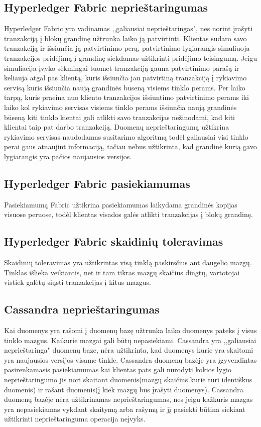 \documentclass{VUMIFPSkursinis}
\begin{document}
	\subsection{Hyperledger Fabric neprieštaringumas}
		Hyperledger Fabric yra vadinamas ,,galiausiai neprieštaringas", nes norint įrašyti tranzakciją į blokų grandinę užtrunka laiko ją patvirtinti. Klientas sudaro savo tranzakciją ir išsiunčia ją patvirtinimo perą, patvirtinimo lygiarangis simuliuoja tranzakcijos pridėjimą į grandinę siekdamas užtikrinti pridėjimo teisingumą. Jeigu simuliacija įvyko sėkmingai tuomet tranzakciją gauna patvirtinimo parašą ir keliauja atgal pas klientą, kuris išsiunčia jau patvirtiną tranzakciją į rykiavimo servisą kuris išsiunčia naują grandinės buseną visiems tinklo perams. Per laiko tarpą, kuris praeina nuo kliento tranzakcijos išsiuntimo patvirtinimo perams iki laiko kol rykiavimo servisas visiems tinklo perams išsiunčia naują grandinės būseną kiti tinklo kientai gali atlikti savo tranzakcijas nežinodami, kad kiti klientai taip pat darbo tranzakciją. Duomenų neprieštaringumą užtikrina rykiavimo servisas naudodamas susitarimo algoritmą todėl galiausiai visi tinklo perai gaus atnaujint informaciją, tačiau nebus užtikrinta, kad grandinė kurią gavo lygiarangis yra pačios naujausios versijos. \cite{HypDoc}
	\subsection{Hyperledger Fabric pasiekiamumas}
		Pasiekiamumą Fabric užtikrina pasiekiamumas laikydama grandinės kopijas visuose peruose, todėl klientas visados galės atlikti tranzakcijas į blokų grandinę. \cite{HypDoc}
	\subsection{Hyperledger Fabric skaidinių toleravimas}
		Skaidinių toleravimas yra užtikrintas visą tinklą paskirsčius ant daugelio mazgų. Tinklas išlieka veikiantis, net ir tam tikras mazgų skaičius dingtų, vartotojai vistiek galėtų siųsti tranzakcijas į kitus mazgus\cite{HypDoc}.
	\subsection{Cassandra neprieštaringumas}
		Kai duomenys yra rašomi į duomenų bazę užtrunka laiko duomenys pateks į visus tinklo mazgus. Kaikurie mazgai gali būtų nepasiekiami. Cassandra yra ,,galiausiai neprieštaringa" duomenų baze, nėra užtikrinta, kad duomenys kurie yra skaitomi yra naujausios versijos visame tinkle. 
Cassandra duomenų bazėje yra įgyvendintas pasirenkamasis pasiekiamumas kai klientas pats gali nurodyti kokios lygio neprieštaringumo jis nori skaitant duomenis(mazgų skaičius kurie turi identiškus duomenis) ir rašant duomenis(į kiek mazgų bus įrašyti duomenys). Cassandra duomenų bazėje nėra užtikrinamas neprieštaringumas, nes jeigu kažkuris mazgas yra nepasiekiamas vykdant skaitymą arba rašymą ir jį pasiekti būtina siekiant užtikrinti neprieštaringuma operacija neįvyks. \cite{CasDesk}
\end{document}
